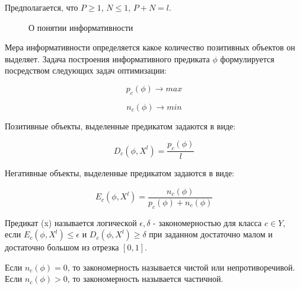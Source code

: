 Предполагается, что $P \geq 1$, $N \leq 1$, $P + N = l$.

\begin{figure}[ht]
    \caption{О понятии информативности}\label{fig:inform}
\end{figure}

Мера информативности определяется какое количество позитивных объектов он выделяет. Задача построения информативного предиката $\phi$ формулируется посредством следующих задач оптимизации:

\begin{equation}
    \label{eq:equation30}
   p_{c}(\phi) \rightarrow max 
\end{equation}

\begin{equation}
    \label{eq:equation31}
    n_{c}(\phi) \rightarrow min
\end{equation}

Позитивные объекты, выделенные предикатом задаются в виде:

\begin{equation}
    \label{eq:equation32}
    D_{c}(\phi, X^{l}) = \frac{p_{c}(\phi)}{l}
\end{equation}

Негативные объекты, выделенные предикатом задаются в виде:

\begin{equation}
    \label{eq:equation33}
    E_{c}(\phi, X^{l}) = \frac{n_{c}(\phi)}{p_{c}(\phi) + n_{c}(\phi)}
\end{equation}

Предикат \phi(x) называется логической $\epsilon, \delta$ - закономерностью для класса $c \in Y $, если $E_{c}(\phi, X^{l}) \leq \epsilon $ и 
$D_{c}(\phi, X^{l}) \geq \delta $ при заданном достаточно малом \epsilon и достаточно большом \delta из отрезка $[0,1]$.

Если $n_{c}(\phi) = 0$, то закономерность \phi называется чистой или непротиворечивой. Если $n_{c}(\phi) > 0$, то закономерность \phi называется частичной.

